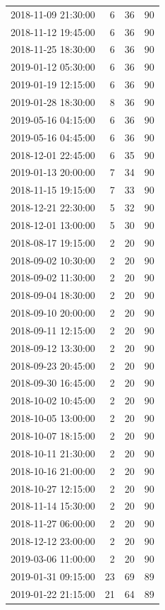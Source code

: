 \begin{tabular}{lrrr}
2018-11-09 21:30:00 & 6 & 36 & 90 \\
2018-11-12 19:45:00 & 6 & 36 & 90 \\
2018-11-25 18:30:00 & 6 & 36 & 90 \\
2019-01-12 05:30:00 & 6 & 36 & 90 \\
2019-01-19 12:15:00 & 6 & 36 & 90 \\
2019-01-28 18:30:00 & 8 & 36 & 90 \\
2019-05-16 04:15:00 & 6 & 36 & 90 \\
2019-05-16 04:45:00 & 6 & 36 & 90 \\
2018-12-01 22:45:00 & 6 & 35 & 90 \\
2019-01-13 20:00:00 & 7 & 34 & 90 \\
2018-11-15 19:15:00 & 7 & 33 & 90 \\
2018-12-21 22:30:00 & 5 & 32 & 90 \\
2018-12-01 13:00:00 & 5 & 30 & 90 \\
2018-08-17 19:15:00 & 2 & 20 & 90 \\
2018-09-02 10:30:00 & 2 & 20 & 90 \\
2018-09-02 11:30:00 & 2 & 20 & 90 \\
2018-09-04 18:30:00 & 2 & 20 & 90 \\
2018-09-10 20:00:00 & 2 & 20 & 90 \\
2018-09-11 12:15:00 & 2 & 20 & 90 \\
2018-09-12 13:30:00 & 2 & 20 & 90 \\
2018-09-23 20:45:00 & 2 & 20 & 90 \\
2018-09-30 16:45:00 & 2 & 20 & 90 \\
2018-10-02 10:45:00 & 2 & 20 & 90 \\
2018-10-05 13:00:00 & 2 & 20 & 90 \\
2018-10-07 18:15:00 & 2 & 20 & 90 \\
2018-10-11 21:30:00 & 2 & 20 & 90 \\
2018-10-16 21:00:00 & 2 & 20 & 90 \\
2018-10-27 12:15:00 & 2 & 20 & 90 \\
2018-11-14 15:30:00 & 2 & 20 & 90 \\
2018-11-27 06:00:00 & 2 & 20 & 90 \\
2018-12-12 23:00:00 & 2 & 20 & 90 \\
2019-03-06 11:00:00 & 2 & 20 & 90 \\
2019-01-31 09:15:00 & 23 & 69 & 89 \\
2019-01-22 21:15:00 & 21 & 64 & 89 \\

\end{tabular}
